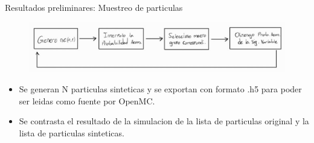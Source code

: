 \documentclass[aspectratio=169,english]{beamer}
\begin{document}
\begin{frame}{Resultados preliminares: Muestreo de particulas}
    \begin{figure}
        \centering
        \includegraphics[width=0.95\linewidth]{imagens/esquema5.jpeg}
        \label{fig:esquema5}
    \end{figure}

    \begin{itemize}
        \item Se generan N particulas sinteticas y se exportan con formato .h5 para poder ser leidas como fuente por OpenMC.
        \item Se contrasta el resultado de la simulacion de la lista de particulas original y la lista de particulas sinteticas.
    \end{itemize}

\end{frame}
\end{document}
